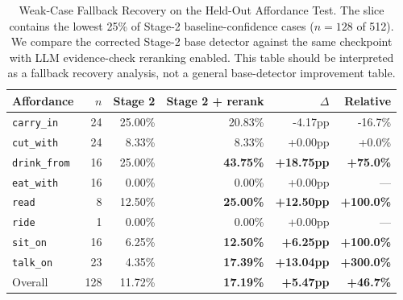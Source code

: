 \begin{table}[t]
\centering
\caption{Weak-Case Fallback Recovery on the Held-Out Affordance Test. The slice contains the lowest 25\% of Stage-2 baseline-confidence cases (\(n=128\) of 512). We compare the corrected Stage-2 base detector against the same checkpoint with LLM evidence-check reranking enabled. This table should be interpreted as a fallback recovery analysis, not a general base-detector improvement table.}
\label{tab:fallback-weak25}
\begin{tabular}{lrrrrr}
\toprule
Affordance & \(n\) & Stage 2 & Stage 2 + rerank & \(\Delta\) & Relative \\
\midrule
\texttt{carry\_in}   & 24 & 25.00\% & 20.83\% & -4.17pp & -16.7\% \\
\texttt{cut\_with}   & 24 &  8.33\% &  8.33\% & +0.00pp & +0.0\% \\
\texttt{drink\_from} & 16 & 25.00\% & \textbf{43.75\%} & \textbf{+18.75pp} & \textbf{+75.0\%} \\
\texttt{eat\_with}   & 16 &  0.00\% &  0.00\% & +0.00pp & --- \\
\texttt{read}        &  8 & 12.50\% & \textbf{25.00\%} & \textbf{+12.50pp} & \textbf{+100.0\%} \\
\texttt{ride}        &  1 &  0.00\% &  0.00\% & +0.00pp & --- \\
\texttt{sit\_on}     & 16 &  6.25\% & \textbf{12.50\%} & \textbf{+6.25pp} & \textbf{+100.0\%} \\
\texttt{talk\_on}    & 23 &  4.35\% & \textbf{17.39\%} & \textbf{+13.04pp} & \textbf{+300.0\%} \\
\midrule
Overall & 128 & 11.72\% & \textbf{17.19\%} & \textbf{+5.47pp} & \textbf{+46.7\%} \\
\bottomrule
\end{tabular}
\end{table}
